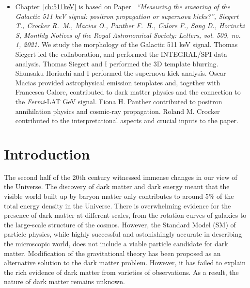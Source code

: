 \documentclass[doublespace,nopageskip]{VTthesis}
\begin{document}
\begin{itemize}
    \thispagestyle{plain}
    \item Chapter~\ref{ch:511keV} is based on Paper~\cite{2022MNRAS.509L..11S} \emph{``Measuring the smearing of the Galactic 511 keV signal: positron propagation or supernova kicks?'', Siegert T., Crocker R.~M., Macias O., Panther F.~H., Calore F., Song D., Horiuchi S, Monthly Notices of the Royal Astronomical Society: Letters, vol. 509, no. 1, 2021.} We study the morphology of the Galactic 511 keV signal. Thomas Siegert led the collaboration, and performed the INTEGRAL/SPI data analysis. Thomas Siegert and I performed the 3D template blurring. Shunsaku Horiuchi and I performed the supernova kick analysis. Oscar Macias provided astrophysical emission templates and, together with Francesca Calore, contributed to dark matter physics and the connection to the \textit{Fermi}-LAT GeV signal. Fiona H. Panther contributed to positron annihilation physics and cosmic-ray propagation. Roland M. Crocker contributed to the interpretational aspects and crucial inputs to the paper.
\end{itemize}

\thispagestyle{plain}


\chapter{Introduction} \label{ch:introduction}

The second half of the 20th century witnessed immense changes in our view of the Universe. The discovery of dark matter and dark energy meant that the visible world built up by baryon matter only contributes to around 5\% of the total energy density in the Universe. There is overwhelming evidence for the presence of dark matter at different scales, from the rotation curves of galaxies to the large-scale structure of the cosmos. However, the Standard Model (SM) of particle physics, while highly successful and astonishingly accurate in describing the microscopic world, does not include a viable particle candidate for dark matter. {Modification of the gravitational theory has been proposed as an alternative solution to the dark matter problem. However, it has failed to explain the rich evidence of dark matter from varieties of observations.} As a result, the nature of dark matter remains unknown. 
\end{document}
